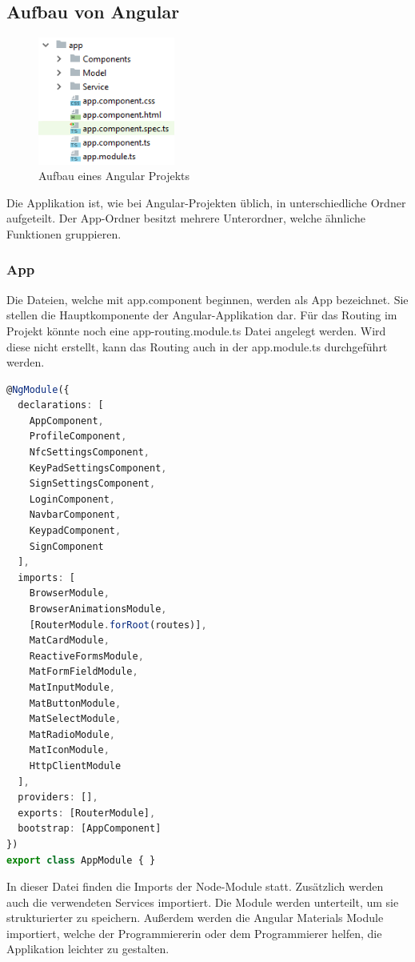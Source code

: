 \subsection{Aufbau von Angular}

\begin{figure}[h]
    \centering
    \includegraphics[width=0.4\textwidth]{pics/Aufbau_Angular.png}
    \caption{Aufbau eines Angular Projekts}
    \end{figure}

Die Applikation ist, wie bei Angular-Projekten üblich, in unterschiedliche Ordner aufgeteilt. Der App-Ordner besitzt mehrere Unterordner, welche ähnliche Funktionen gruppieren.

\subsubsection{App}
Die Dateien, welche mit app.component beginnen, werden als App bezeichnet. Sie stellen die Hauptkomponente der Angular-Applikation dar. Für das Routing im Projekt könnte noch eine app-routing.module.ts Datei angelegt werden. Wird diese nicht erstellt, kann das Routing auch in der app.module.ts durchgeführt werden. 
\pagebreak
\begin{lstlisting}[language=typescript, caption=app.module.ts]
@NgModule({
  declarations: [
    AppComponent,
    ProfileComponent,
    NfcSettingsComponent,
    KeyPadSettingsComponent,
    SignSettingsComponent,
    LoginComponent,
    NavbarComponent,
    KeypadComponent,
    SignComponent
  ],
  imports: [
    BrowserModule,
    BrowserAnimationsModule,
    [RouterModule.forRoot(routes)],
    MatCardModule,
    ReactiveFormsModule,
    MatFormFieldModule,
    MatInputModule,
    MatButtonModule,
    MatSelectModule,
    MatRadioModule,
    MatIconModule,
    HttpClientModule
  ],
  providers: [],
  exports: [RouterModule],
  bootstrap: [AppComponent]
})
export class AppModule { }
\end{lstlisting}

In dieser Datei finden die Imports der Node-Module statt. Zusätzlich werden auch die verwendeten Services importiert. Die Module werden unterteilt, um sie strukturierter zu speichern. Außerdem werden die Angular Materials Module importiert, welche der Programmiererin oder dem Programmierer helfen, die Applikation leichter zu gestalten. 

